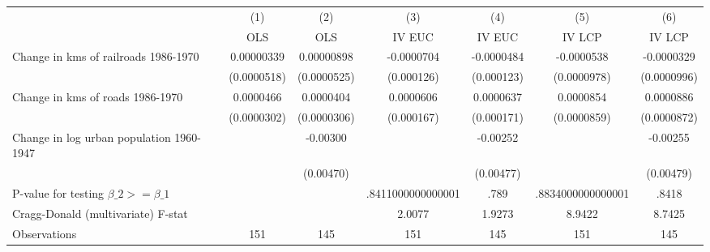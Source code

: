 {
\def\sym#1{\ifmmode^{#1}\else\(^{#1}\)\fi}
\begin{tabular}{l*{6}{c}}
\hline\hline
                &\multicolumn{1}{c}{(1)}&\multicolumn{1}{c}{(2)}&\multicolumn{1}{c}{(3)}&\multicolumn{1}{c}{(4)}&\multicolumn{1}{c}{(5)}&\multicolumn{1}{c}{(6)}\\
                &\multicolumn{1}{c}{OLS}&\multicolumn{1}{c}{OLS}&\multicolumn{1}{c}{IV EUC}&\multicolumn{1}{c}{IV EUC}&\multicolumn{1}{c}{IV LCP}&\multicolumn{1}{c}{IV LCP}\\
\hline
Change in kms of railroads 1986-1970&0.00000339         &0.00000898         &-0.0000704         &-0.0000484         &-0.0000538         &-0.0000329         \\
                &(0.0000518)         &(0.0000525)         &(0.000126)         &(0.000123)         &(0.0000978)         &(0.0000996)         \\
[1em]
Change in kms of roads 1986-1970&0.0000466         &0.0000404         &0.0000606         &0.0000637         &0.0000854         &0.0000886         \\
                &(0.0000302)         &(0.0000306)         &(0.000167)         &(0.000171)         &(0.0000859)         &(0.0000872)         \\
[1em]
Change in log urban population 1960-1947&                  & -0.00300         &                  & -0.00252         &                  & -0.00255         \\
                &                  &(0.00470)         &                  &(0.00477)         &                  &(0.00479)         \\
\hline
P-value for testing $\beta\_{2} >= \beta\_{1}$&                  &                  &.8411000000000001         &     .789         &.8834000000000001         &    .8418         \\
Cragg-Donald (multivariate) F-stat&                  &                  &   2.0077         &   1.9273         &   8.9422         &   8.7425         \\
Observations    &      151         &      145         &      151         &      145         &      151         &      145         \\
\hline\hline
\end{tabular}
}
